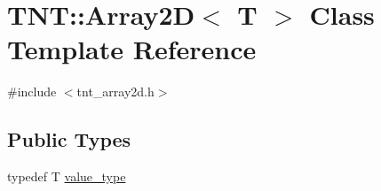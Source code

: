\hypertarget{classTNT_1_1Array2D}{}\section{T\+NT\+:\+:Array2D$<$ T $>$ Class Template Reference}
\label{classTNT_1_1Array2D}


{\ttfamily \#include $<$tnt\+\_\+array2d.\+h$>$}

\subsection*{Public Types}
\begin{DoxyCompactItemize}
\item 
typedef T \hyperlink{classTNT_1_1Array2D_a4b8dd8e113fb40e26d44bc2f7a45cb44}{value\+\_\+type}
\end{DoxyCompactItemize}
